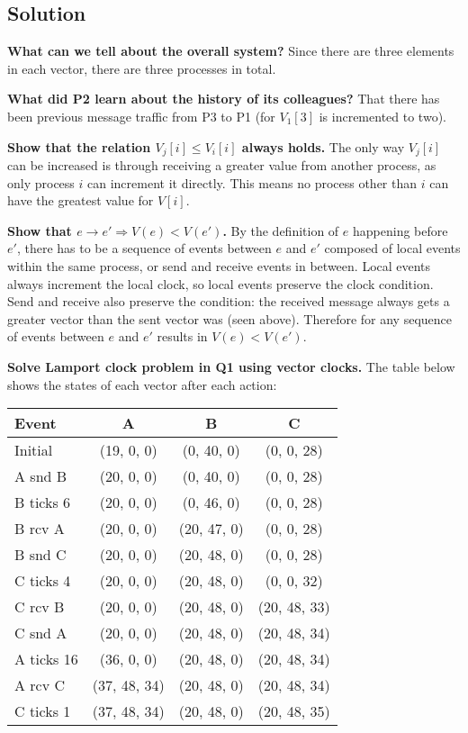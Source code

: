 \documentclass[12pt,a4paper,titlepage]{article}
\begin{document}
\subsection{Solution}

\textbf{What can we tell about the overall system?} Since there are three elements in each vector, there are three processes in total.

\textbf{What did P2 learn about the history of its colleagues?} That there has been previous message traffic from P3 to P1 (for $V_1[3]$ is incremented to two).

\textbf{Show that the relation $V_j[i] \leq V_i[i]$ always holds.} The only way $V_j[i]$ can be increased is through receiving a greater value from another process, as only process $i$ can increment it directly. This means no process other than $i$ can have the greatest value for $V[i]$.

\textbf{Show that $e \to e' \Rightarrow V(e) < V(e')$.} By the definition of $e$ happening before $e'$, there has to be a sequence of events between $e$ and $e'$ composed of local events within the same process, or send and receive events in between. Local events always increment the local clock, so local events preserve the clock condition. Send and receive also preserve the condition: the received message always gets a greater vector than the sent vector was (seen above). Therefore for any sequence of events between $e$ and $e'$ results in $V(e) < V(e')$.

\textbf{Solve Lamport clock problem in Q1 using vector clocks.} The table below shows the states of each vector after each action:

\begin{tabular}{ | l | c | c | c |} \hline
\textbf{Event} & \textbf{A} & \textbf{B} & \textbf{C} \\ \hline
Initial & (19, 0, 0) & (0, 40, 0) & (0, 0, 28) \\ \hline
A snd B & (20, 0, 0) & (0, 40, 0) & (0, 0, 28) \\ \hline
B ticks 6 & (20, 0, 0) & (0, 46, 0) & (0, 0, 28) \\ \hline
B rcv A & (20, 0, 0) & (20, 47, 0) & (0, 0, 28) \\ \hline
B snd C & (20, 0, 0) & (20, 48, 0) & (0, 0, 28) \\ \hline
C ticks 4 & (20, 0, 0) & (20, 48, 0) & (0, 0, 32) \\ \hline
C rcv B & (20, 0, 0) & (20, 48, 0) & (20, 48, 33) \\ \hline
C snd A & (20, 0, 0) & (20, 48, 0) & (20, 48, 34) \\ \hline
A ticks 16 & (36, 0, 0) & (20, 48, 0) & (20, 48, 34) \\ \hline
A rcv C & (37, 48, 34) & (20, 48, 0) & (20, 48, 34) \\ \hline
C ticks 1 & (37, 48, 34) & (20, 48, 0) & (20, 48, 35) \\ \hline
\end{tabular}
\end{document}
